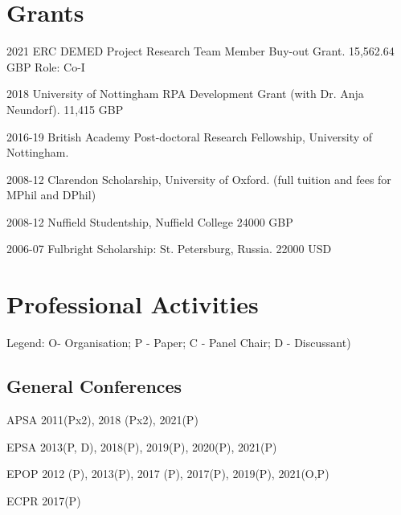 \documentclass[12pt,letterpaper]{report}
\begin{document}
  \section*{Grants}

\begin{tablist}
	
	\item[2021]   \tab{}ERC DEMED Project Research Team Member Buy-out Grant. 15,562.64 GBP Role: Co-I
	
	
	\item[2018] \tab{}University of Nottingham RPA Development Grant (with Dr. Anja Neundorf). 11,415 GBP

	
	\item[2016-19] \tab{}British Academy Post-doctoral Research Fellowship, University of Nottingham. 
	
	\item[2008-12] \tab{}Clarendon Scholarship, University of Oxford.  (full tuition and fees for MPhil and DPhil) 
	
	\item[2008-12] \tab{}Nuffield Studentship, Nuffield College 24000 GBP
	
	\item[2006-07] \tab{}Fulbright Scholarship: St. Petersburg, Russia.  22000 USD
	
	
\end{tablist}

  \section*{Professional Activities}
  
  Legend:  O- Organisation; P - Paper; C - Panel Chair; D - Discussant) \\

\subsection*{General Conferences}



\begin{tablist}
	
	\item[APSA]   \tab{}2011(Px2), 2018 (Px2), 2021(P)
	
	
	\item[EPSA] \tab{}2013(P, D), 2018(P), 2019(P), 2020(P), 2021(P)
	
	
	\item[EPOP] \tab{}2012 (P), 2013(P), 2017 (P), 2017(P), 2019(P), 2021(O,P)
	
	\item[ECPR] \tab{}2017(P)
	
	
\end{tablist}
\end{document}
